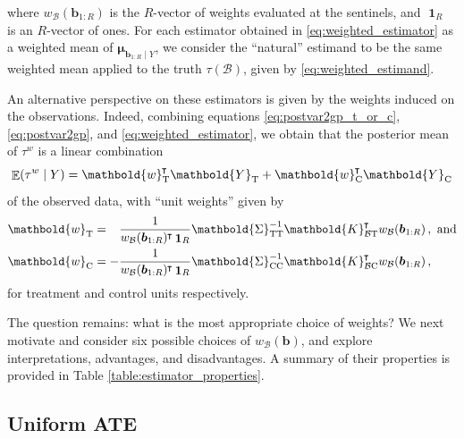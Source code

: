 \documentclass[letter]{article}
\DeclarePairedDelimiter{\parenthesis}{\lparen}{\rparen}
\newcommand{\del}[1]{\parenthesis*{#1}}
\DeclareMathOperator{\E}{\mathbb{E}}
\DeclareMathOperator{\ones}{\mathbf{1}}
\newcommand*{\trans}{^{\mkern-1.5mu\intercal}}
\newcommand{\treat}{\mathrm{T}}
\newcommand{\ctrol}{\mathrm{C}}
\newcommand{\wvec}{\mathbold{w}}
\newcommand{\Yvec}{\mathbold{Y}}
\newcommand{\yt}{\Yvec_{\treat}}
\newcommand{\yc}{\Yvec_{\ctrol}}
\newcommand{\muvec}{\mathbold{\mu}}
\newcommand{\border}{\mathcal{B}}
\newcommand{\sentinel}{\bm{b}}
\newcommand{\numsent}{R}
\newcommand{\sentinels}{\sentinel_{1:\numsent}}
\newcommand{\tauw}{\tau^{w}}
\newcommand{\eqlabel}[1]{\label{#1}}
\newcommand{\weightb}{w_{\border}}
\newcommand{\wt}{\wvec_{\treat}}
\newcommand{\wc}{\wvec_{\ctrol}}
\newcommand{\Kmat}{\mathbold{K}}
\newcommand{\SigmaMat}{\mathbold{\Sigma}}
\newcommand{\KBT}{\Kmat_{\border \treat}}
\newcommand{\KBC}{\Kmat_{\border \ctrol}}
\newcommand{\STT}{\SigmaMat_{\treat \treat}}
\newcommand{\SCC}{\SigmaMat_{\ctrol \ctrol}}
\begin{document}
where \(\weightb(\sentinels)\) is the \(\numsent\)-vector of weights evaluated at the sentinels, and \(\ones_\numsent\) is an \(\numsent\)-vector of ones.
For each estimator obtained in \eqref{eq:weighted_estimator} as a weighted mean of \(\muvec_{\sentinels \mid Y}\), we consider the ``natural'' estimand to be the same weighted mean applied to the truth \(\tau(\border)\), given by \eqref{eq:weighted_estimand}.

An alternative perspective on these estimators is given by the weights induced on the observations.
Indeed, combining equations \eqref{eq:postvar2gp_t_or_c}, \eqref{eq:postvar2gp}, and \eqref{eq:weighted_estimator}, we obtain that the posterior mean of \(\tauw\) is a linear combination
\begin{equation}
\E\del{\tauw \mid Y} = \wt\trans \yt + \wc\trans \yc
\eqlabel{eq:unit_weights}
\end{equation}
of the observed data, with ``unit weights'' given by
\begin{equation}
\begin{split}
\wt &= \hphantom{-} \frac{1}{\weightb(\sentinels)\trans \ones_{\numsent}}
\STT^{-1} 
\KBT\trans \weightb(\sentinels) \,, 
\text{ and}
\\
\wc &= -\frac{1}{\weightb(\sentinels)\trans \ones_{\numsent}} 
\SCC^{-1} 
\KBC\trans \weightb(\sentinels) \,,
\end{split}
\eqlabel{eq:unit_weights_gp}
\end{equation}
for treatment and control units respectively.

The question remains: what is the most appropriate choice of weights? We next motivate and consider six possible choices of \(\weightb(\sentinel)\), and explore interpretations, advantages, and disadvantages. A summary of their properties is provided in Table \ref{table:estimator_properties}.
    


    	\hypertarget{uniform-ate}{%
\subsection{Uniform ATE}\label{uniform-ate}}
\end{document}
